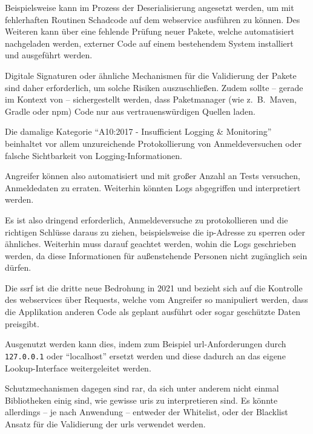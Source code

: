 	Beispielsweise kann im Prozess der Deserialisierung angesetzt werden,
	um mit fehlerhaften Routinen Schadcode auf dem \gls{webservice} ausführen zu können.
	Des Weiteren kann über eine fehlende Prüfung neuer Pakete,
	welche automatisiert nachgeladen werden,
	externer Code auf einem bestehendem System installiert und ausgeführt werden.

	Digitale Signaturen oder ähnliche Mechanismen für die Validierung der Pakete sind daher erforderlich,
	um solche Risiken auszuschließen.
	Zudem sollte -- gerade im Kontext von \webApplications{} -- sichergestellt werden,
	dass Paketmanager (wie z.\ B.\ Maven, Gradle oder npm) Code nur aus vertrauenswürdigen Quellen laden.

	Die damalige Kategorie \enquote{A10:2017 - Insufficient Logging \& Monitoring} beinhaltet vor allem
	unzureichende Protokollierung von Anmeldeversuchen oder falsche Sichtbarkeit von Logging-Informationen.

	Angreifer können also automatisiert und mit großer Anzahl an Tests versuchen,
	Anmeldedaten zu erraten.
	Weiterhin könnten Logs abgegriffen und interpretiert werden.

	Es ist also dringend erforderlich,
	Anmeldeversuche zu protokollieren und die richtigen Schlüsse daraus zu ziehen,
	beispielsweise die \gls{ip}-Adresse zu sperren oder ähnliches.
	Weiterhin muss darauf geachtet werden,
	wohin die Logs geschrieben werden,
	da diese Informationen für außenstehende Personen nicht zugänglich sein dürfen.

	Die \gls{ssrf} ist die dritte neue Bedrohung in 2021
	und bezieht sich auf die Kontrolle des \glspl{webservice} über Requests,
	welche vom Angreifer so manipuliert werden,
	dass die Applikation anderen Code als geplant ausführt oder sogar geschützte Daten preisgibt.

	Ausgenutzt werden kann dies,
	indem zum Beispiel \gls{url}-Anforderungen durch \lstinline!127.0.0.1! oder \enquote{localhost} ersetzt werden
	und diese dadurch an das eigene Lookup-Interface weitergeleitet werden.

	Schutzmechanismen dagegen sind rar,
	da sich unter anderem nicht einmal Bibliotheken einig sind,
	wie gewisse \glspl{uri} zu interpretieren sind.
	Es könnte allerdings -- je nach Anwendung -- entweder der Whitelist,
	oder der Blacklist Ansatz für die Validierung der \glspl{url} verwendet werden.
